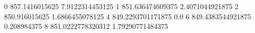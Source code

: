0 857.1416015625 7.9122314453125
1 851.636474609375 2.4071044921875
2 850.916015625 1.6866455078125
4 849.2293701171875 0.0
6 849.4383544921875 0.208984375
8 851.0222778320312 1.79290771484375

